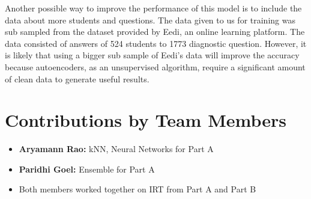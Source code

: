 \documentclass{article}
\begin{document}
Another possible way to improve the performance of this model is to include the data about more students and questions. The data given to us for training was sub sampled from the dataset provided by Eedi, an online learning platform. The data consisted of answers of 524 students to 1773 diagnostic question. However, it is likely that using a bigger sub sample of Eedi's data will improve the accuracy because autoencoders, as an unsupervised algorithm, require a significant amount of clean data to generate useful results. 


\section*{Contributions by Team Members}
 
 
\begin{itemize}
  
  \item \textbf{Aryamann Rao:} kNN, Neural Networks for Part A
  \item \textbf{Paridhi Goel:} Ensemble for Part A
  \item Both members worked together on IRT from Part A and Part B
\end{itemize}
\end{document}
